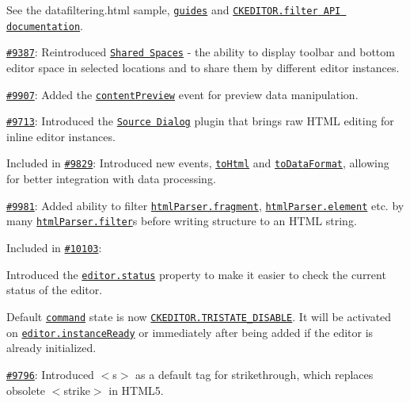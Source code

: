 {\begin{DoxyItemize}
See the {\ttfamily datafiltering.\+html} sample, \href{http://docs.ckeditor.com/#!/guide/dev_advanced_content_filter}{\tt guides} and \href{http://docs.ckeditor.com/#!/api/CKEDITOR.filter}{\tt {\ttfamily C\+K\+E\+D\+I\+T\+O\+R.\+filter} A\+PI documentation}.
\item \href{http://dev.ckeditor.com/ticket/9387}{\tt \#9387}\+: Reintroduced \href{http://ckeditor.com/addon/sharedspace}{\tt Shared Spaces} -\/ the ability to display toolbar and bottom editor space in selected locations and to share them by different editor instances.
\item \href{http://dev.ckeditor.com/ticket/9907}{\tt \#9907}\+: Added the \href{http://docs.ckeditor.com/#!/api/CKEDITOR-event-contentPreview}{\tt {\ttfamily content\+Preview}} event for preview data manipulation.
\item \href{http://dev.ckeditor.com/ticket/9713}{\tt \#9713}\+: Introduced the \href{http://ckeditor.com/addon/sourcedialog}{\tt Source Dialog} plugin that brings raw H\+T\+ML editing for inline editor instances.
\item Included in \href{http://dev.ckeditor.com/ticket/9829}{\tt \#9829}\+: Introduced new events, \href{http://docs.ckeditor.com/#!/api/CKEDITOR.editor-event-toHtml}{\tt {\ttfamily to\+Html}} and \href{http://docs.ckeditor.com/#!/api/CKEDITOR.editor-event-toDataFormat}{\tt {\ttfamily to\+Data\+Format}}, allowing for better integration with data processing.
\item \href{http://dev.ckeditor.com/ticket/9981}{\tt \#9981}\+: Added ability to filter \href{http://docs.ckeditor.com/#!/api/CKEDITOR.htmlParser.fragment}{\tt {\ttfamily html\+Parser.\+fragment}}, \href{http://docs.ckeditor.com/#!/api/CKEDITOR.htmlParser.element}{\tt {\ttfamily html\+Parser.\+element}} etc. by many \href{http://docs.ckeditor.com/#!/api/CKEDITOR.htmlParser.filter}{\tt {\ttfamily html\+Parser.\+filter}}s before writing structure to an H\+T\+ML string.
\item Included in \href{http://dev.ckeditor.com/ticket/10103}{\tt \#10103}\+:
\begin{DoxyItemize}
\item Introduced the \href{http://docs.ckeditor.com/#!/api/CKEDITOR.editor-property-status}{\tt {\ttfamily editor.\+status}} property to make it easier to check the current status of the editor.
\item Default \href{http://docs.ckeditor.com/#!/api/CKEDITOR.command}{\tt {\ttfamily command}} state is now \href{http://docs.ckeditor.com/#!/api/CKEDITOR-property-TRISTATE_DISABLED}{\tt {\ttfamily C\+K\+E\+D\+I\+T\+O\+R.\+T\+R\+I\+S\+T\+A\+T\+E\+\_\+\+D\+I\+S\+A\+B\+LE}}. It will be activated on \href{http://docs.ckeditor.com/#!/api/CKEDITOR-event-instanceReady}{\tt {\ttfamily editor.\+instance\+Ready}} or immediately after being added if the editor is already initialized.
\end{DoxyItemize}
\item \href{http://dev.ckeditor.com/ticket/9796}{\tt \#9796}\+: Introduced {\ttfamily $<$s$>$} as a default tag for strikethrough, which replaces obsolete {\ttfamily $<$strike$>$} in H\+T\+M\+L5.
\end{DoxyItemize}}

